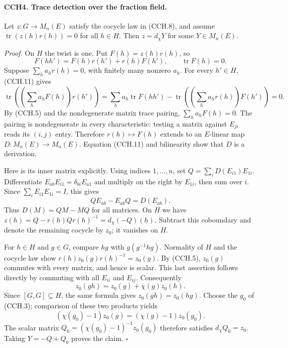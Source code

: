 \paragraph{CCH4. Trace detection over the fraction field.}
\label{claim:CCH4}
Let $z:G\to M_n(E)$ satisfy the cocycle law in (CCH.8), and
assume $\operatorname{tr}(z(h)r(h))=0$ for all $h\in H$.
Then $z=d_\chi Y$ for some $Y\in M_n(E)$.

\emph{Proof.}
On $H$ the twist is one.  Put $F(h)=z(h)r(h)$, so
\[
 F(hh')=F(h)r(h')+r(h)F(h'),\qquad \operatorname{tr}F(h)=0.
 \tag{CCH.11}
\]
Suppose $\sum_h a_h r(h)=0$, with finitely many nonzero $a_h$.
For every $h'\in H$, (CCH.11) gives
\[
 \operatorname{tr}\left(\left(\sum_h a_hF(h)\right)r(h')\right)
 =\sum_h a_h\operatorname{tr}F(hh')
       -\operatorname{tr}\left(\left(\sum_h a_hr(h)\right)F(h')\right)=0.
\]
By (CCH.5) and the nondegenerate matrix trace pairing,
$\sum_h a_hF(h)=0$.  The pairing is nondegenerate in every
characteristic: testing a matrix against $E_{ji}$ reads its
$(i,j)$ entry.  Therefore $r(h)\mapsto F(h)$ extends to an
$E$-linear map $D:M_n(E)\to M_n(E)$.  Equation (CCH.11)
and bilinearity show that $D$ is a derivation.

Here is its inner matrix explicitly.  Using indices
$1,\ldots,n$, set $Q=\sum_iD(E_{i1})E_{1i}$.
Differentiate $E_{ab}E_{i1}=\delta_{bi}E_{a1}$ and multiply
on the right by $E_{1i}$, then sum over $i$.  Since
$\sum_iE_{i1}E_{1i}=I$, this gives
\[
             QE_{ab}-E_{ab}Q=D(E_{ab}).                \tag{CCH.12}
\]
Thus $D(M)=QM-MQ$ for all matrices.  On $H$ we have
$z(h)=Q-r(h)Qr(h)^{-1}=d_\chi(-Q)(h)$.
Subtract this coboundary and denote the remaining cocycle by $z_0$;
it vanishes on $H$.

For $h\in H$ and $g\in G$, compare $hg$ with
$g(g^{-1}hg)$.  Normality of $H$ and the cocycle law show
$r(h)z_0(g)r(h)^{-1}=z_0(g)$.  By (CCH.5), $z_0(g)$
commutes with every matrix, and hence is scalar.  This last
assertion follows directly by commuting with all $E_{ii}$ and
$E_{ij}$.  Consequently
\[
 z_0(gh)=z_0(g)+\chi(g)z_0(h).
\]
Since $[G,G]\subseteq H$, the same formula gives
$z_0(gh)=z_0(hg)$.  Choose the $g_0$ of (CCH.3); comparison
of these two products yields
\[
 (\chi(g_0)-1)z_0(g)=(\chi(g)-1)z_0(g_0).
\]
The scalar matrix $Q_0=(\chi(g_0)-1)^{-1}z_0(g_0)$ therefore
satisfies $d_\chi Q_0=z_0$.  Taking $Y=-Q+Q_0$ proves the claim.
\hfill$\square$

